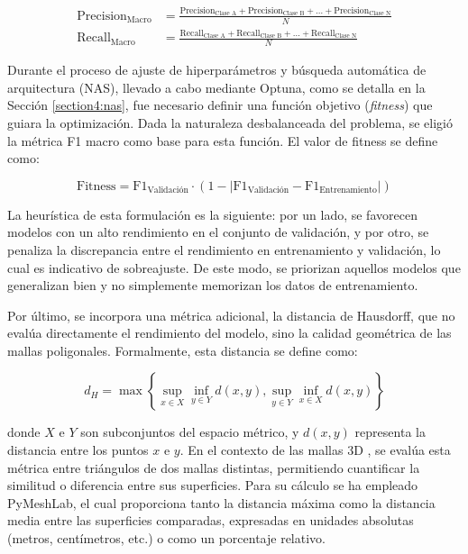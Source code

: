 \begin{align}
    \text{Precision}_{\text{Macro}} &= \frac{\text{Precision}_{\text{Clase A}}+\text{Precision}_{\text{Clase B}}+\dots+\text{Precision}_{\text{Clase N}}}{N} \\
    \text{Recall}_{\text{Macro}} &= \frac{\text{Recall}_{\text{Clase A}}+\text{Recall}_{\text{Clase B}}+\dots+\text{Recall}_{\text{Clase N}}}{N}
\end{align}

Durante el proceso de ajuste de hiperparámetros y búsqueda automática de arquitectura (NAS), llevado a cabo mediante Optuna, como se detalla en la Sección \ref{section4:nas}, fue necesario definir una función objetivo (\textit{fitness}) que guiara la optimización. Dada la naturaleza desbalanceada del problema, se eligió la métrica F1 macro como base para esta función. El valor de fitness se define como:

\begin{equation}
    \text{Fitness} = \text{F1}_{\text{Validación}} \cdot (1 - | \text{F1}_{\text{Validación}} -  \text{F1}_{\text{Entrenamiento}}|)
\end{equation}

La heurística de esta formulación es la siguiente: por un lado, se favorecen modelos con un alto rendimiento en el conjunto de validación, y por otro, se penaliza la discrepancia entre el rendimiento en entrenamiento y validación, lo cual es indicativo de sobreajuste. De este modo, se priorizan aquellos modelos que generalizan bien y no simplemente memorizan los datos de entrenamiento.

Por último, se incorpora una métrica adicional, la distancia de Hausdorff, que no evalúa directamente el rendimiento del modelo, sino la calidad geométrica de las mallas poligonales. Formalmente, esta distancia se define como:

\begin{equation}
d_H = \max\left\{\sup_{x\in X} \inf_{y \in Y} d(x,y), \sup_{y\in Y} \inf_{x \in X} d(x,y) \right\}
\end{equation}

donde $X$ e $Y$ son subconjuntos del espacio métrico, y $d(x,y)$ representa la distancia entre los puntos $x$ e $y$. En el contexto de las mallas 3D \cite{cignoni1998metro}, se evalúa esta métrica entre triángulos de dos mallas distintas, permitiendo cuantificar la similitud o diferencia entre sus superficies. Para su cálculo se ha empleado PyMeshLab, el cual proporciona tanto la distancia máxima como la distancia media entre las superficies comparadas, expresadas en unidades absolutas (metros, centímetros, etc.) o como un porcentaje relativo.


